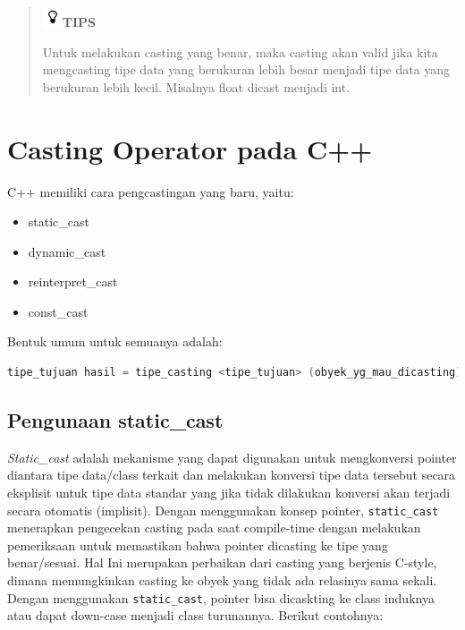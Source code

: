 \begin{quotation}

\includegraphics{../manuscript/images/tips}\textbf{TIPS} 

Untuk melakukan casting yang benar, maka casting akan valid jika kita mengcasting tipe data yang berukuran lebih besar menjadi tipe data yang berukuran lebih kecil. Misalnya float dicast menjadi int.
\end{quotation}


\section{Casting Operator pada C++}\label{casting-operator-pada-c}

C++ memiliki cara pengcastingan yang baru, yaitu:

\begin{itemize}

\item
  static\_cast
\item
  dynamic\_cast
\item
  reinterpret\_cast
\item
  const\_cast
\end{itemize}

Bentuk umum untuk semuanya adalah:

\begin{lstlisting}[language=c++, numbers=none]
tipe_tujuan hasil = tipe_casting <tipe_tujuan> (obyek_yg_mau_dicasting);
\end{lstlisting}

\subsection{Pengunaan static\_cast}\label{pengunaan-staticux5fcast}

\emph{Static\_cast} adalah mekanisme yang dapat digunakan untuk
mengkonversi pointer diantara tipe data/class terkait dan melakukan
konversi tipe data tersebut secara eksplisit untuk tipe data standar
yang jika tidak dilakukan konversi akan terjadi secara otomatis
(implisit). Dengan menggunakan konsep pointer, \texttt{static\_cast}
menerapkan pengecekan casting pada saat compile-time dengan melakukan
pemeriksaan untuk memastikan bahwa pointer dicasting ke tipe yang
benar/sesuai. Hal Ini merupakan perbaikan dari casting yang berjenis
C-style, dimana memungkinkan casting ke obyek yang tidak ada relasinya
sama sekali. Dengan menggunakan \texttt{static\_cast}, pointer bisa
dicaskting ke class induknya atau dapat down-case menjadi class
turunannya. Berikut contohnya:

